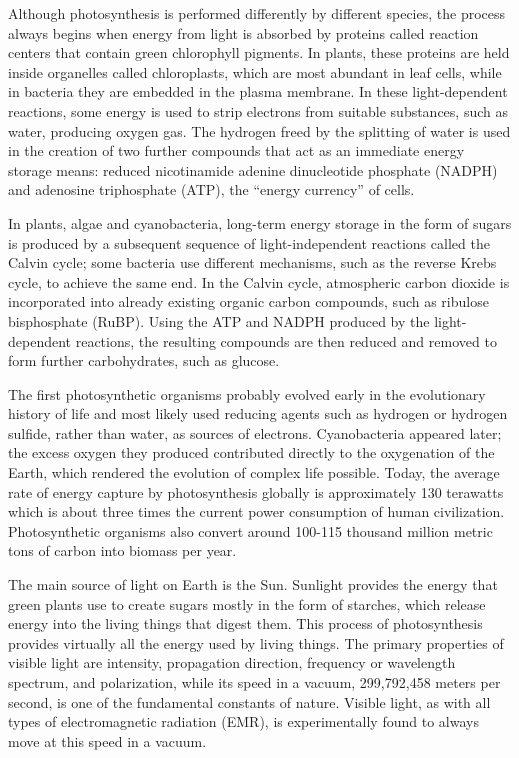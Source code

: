 \documentclass[]{book}
\begin{document}
Although photosynthesis is performed differently by different species, the process always begins when energy from light is absorbed by proteins called reaction centers that contain green chlorophyll pigments. In plants, these proteins are held inside organelles called chloroplasts, which are most abundant in leaf cells, while in bacteria they are embedded in the plasma membrane. In these light-dependent reactions, some energy is used to strip electrons from suitable substances, such as water, producing oxygen gas. The hydrogen freed by the splitting of water is used in the creation of two further compounds that act as an immediate energy storage means: reduced nicotinamide adenine dinucleotide phosphate (NADPH) and adenosine triphosphate (ATP), the ``energy currency'' of cells.

In plants, algae and cyanobacteria, long-term energy storage in the form of sugars is produced by a subsequent sequence of light-independent reactions called the Calvin cycle; some bacteria use different mechanisms, such as the reverse Krebs cycle, to achieve the same end. In the Calvin cycle, atmospheric carbon dioxide is incorporated into already existing organic carbon compounds, such as ribulose bisphosphate (RuBP). Using the ATP and NADPH produced by the light-dependent reactions, the resulting compounds are then reduced and removed to form further carbohydrates, such as glucose.

The first photosynthetic organisms probably evolved early in the evolutionary history of life and most likely used reducing agents such as hydrogen or hydrogen sulfide, rather than water, as sources of electrons. Cyanobacteria appeared later; the excess oxygen they produced contributed directly to the oxygenation of the Earth, which rendered the evolution of complex life possible. Today, the average rate of energy capture by photosynthesis globally is approximately 130 terawatts which is about three times the current power consumption of human civilization. Photosynthetic organisms also convert around 100-115 thousand million metric tons of carbon into biomass per year.

The main source of light on Earth is the Sun. Sunlight provides the energy that green plants use to create sugars mostly in the form of starches, which release energy into the living things that digest them. This process of photosynthesis provides virtually all the energy used by living things.
The primary properties of visible light are intensity, propagation direction, frequency or wavelength spectrum, and polarization, while its speed in a vacuum, 299,792,458 meters per second, is one of the fundamental constants of nature. Visible light, as with all types of electromagnetic radiation (EMR), is experimentally found to always move at this speed in a vacuum.
\end{document}
